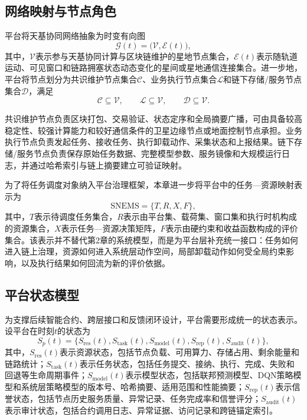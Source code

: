 \subsection{网络映射与节点角色}

平台将天基协同网络抽象为时变有向图
\begin{equation}
  \mathcal{G}(t)=\big(\mathcal{V},\mathcal{E}(t)\big),
  \label{eq:platform_graph}
\end{equation}
其中，\(\mathcal{V}\)表示参与天基协同计算与区块链维护的星地节点集合，\(\mathcal{E}(t)\)表示随轨道运动、可见窗口和链路拥塞状态动态变化的星间或星地通信连接集合。进一步地，平台将节点划分为共识维护节点集合\(\mathcal{C}\)、业务执行节点集合\(\mathcal{L}\)和链下存储/服务节点集合\(\mathcal{D}\)，满足
\begin{equation}
  \mathcal{C}\subseteq \mathcal{V}, \qquad \mathcal{L}\subseteq \mathcal{V}, \qquad \mathcal{D}\subseteq \mathcal{V}.
  \label{eq:node_sets}
\end{equation}

共识维护节点负责区块打包、交易验证、状态定序和全局摘要广播，可由具备较高稳定性、较强计算能力和较好通信条件的卫星边缘节点或地面控制节点承担。业务执行节点负责发起任务、接收任务、执行卸载动作、采集状态和上报结果。链下存储/服务节点负责保存原始任务数据、完整模型参数、服务镜像和大规模运行日志，并通过哈希索引与链上摘要建立可验证映射。

为了将任务调度对象纳入平台治理框架，本章进一步将平台中的任务—资源映射表示为
\begin{equation}
  \mathrm{SNEMS}=\{T,R,X,F\},
  \label{eq:snems}
\end{equation}
其中，\(T\)表示待调度任务集合，\(R\)表示由平台集、载荷集、窗口集和执行时机构成的资源集合，\(X\)表示任务—资源决策矩阵，\(F\)表示由硬约束和收益函数构成的评价集合。该表示并不替代第2章的系统模型，而是为平台层补充统一接口：任务如何进入链上治理，资源如何进入系统层动作空间，局部卸载动作如何受全局约束影响，以及执行结果如何回流为新的评价依据。

\subsection{平台状态模型}

为支撑后续智能合约、跨层接口和反馈闭环设计，平台需要形成统一的状态表示。设平台在时刻\(t\)的状态为
\begin{equation}
  S_p(t)=\big\{S_{\mathrm{res}}(t),S_{\mathrm{task}}(t),S_{\mathrm{model}}(t),S_{\mathrm{rep}}(t),S_{\mathrm{audit}}(t)\big\},
  \label{eq:platform_state}
\end{equation}
其中，\(S_{\mathrm{res}}(t)\)表示资源状态，包括节点负载、可用算力、存储占用、剩余能量和链路统计；\(S_{\mathrm{task}}(t)\)表示任务状态，包括任务提交、接纳、执行、完成、失败和回退等生命周期事件；\(S_{\mathrm{model}}(t)\)表示模型状态，包括联邦预测模型、DQN策略模型和系统层策略模型的版本号、哈希摘要、适用范围和性能摘要；\(S_{\mathrm{rep}}(t)\)表示信誉状态，包括节点历史服务质量、异常记录、任务完成率和信誉评分；\(S_{\mathrm{audit}}(t)\)表示审计状态，包括合约调用日志、异常证据、访问记录和跨链锚定索引。

